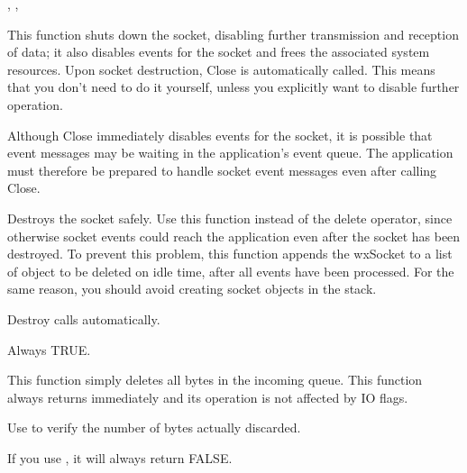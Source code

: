, 
, 

%
%
\label{wxsocketbaseclose}


This function shuts down the socket, disabling further transmission and
reception of data; it also disables events for the socket and frees the
associated system resources. Upon socket destruction, Close is automatically
called. This means that you don't need to do it yourself, unless you
explicitly want to disable further operation.


Although Close immediately disables events for the socket, it is possible
that event messages may be waiting in the application's event queue. The
application must therefore be prepared to handle socket event messages
even after calling Close.

%
%
\label{wxsocketbasedestroy}


Destroys the socket safely. Use this function instead of the delete operator,
since otherwise socket events could reach the application even after the
socket has been destroyed. To prevent this problem, this function appends
the wxSocket to a list of object to be deleted on idle time, after all
events have been processed. For the same reason, you should avoid creating
socket objects in the stack.

Destroy calls  automatically.


Always TRUE.

%
%
\label{wxsocketbasediscard}


This function simply deletes all bytes in the incoming queue. This function
always returns immediately and its operation is not affected by IO flags.

Use  to verify the number of bytes actually discarded.

If you use , it will always return FALSE.

